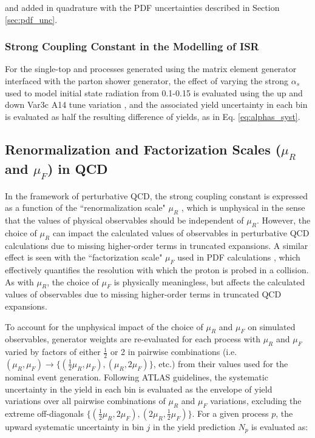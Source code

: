 \noindent and added in quadrature with the PDF uncertainties described in Section \ref{sec:pdf_unc}.

\subsubsection{Strong Coupling Constant in the Modelling of ISR}

For the single-top and \ttbar processes generated using the \POWHEGBOX matrix element generator interfaced with the  parton shower generator, the effect of varying the strong \(\alpha_s\) used to model initial state radiation from 0.1-0.15 is evaluated using the up and down Var3c A14 tune variation \cite{ATL-PHYS-PUB-2014-021}, and the associated yield uncertainty in each bin is evaluated as half the resulting difference of yields, as in Eq. \ref{eq:alphas_syst}. 

\subsection{Renormalization and Factorization Scales (\(\mu_R\) and \(\mu_F\)) in QCD}

In the framework of perturbative QCD, the strong coupling constant is expressed as a function of the ``renormalization scale" \(\mu_R\) \cite{PDG_2018}, which is unphysical in the sense that the values of physical observables should be independent of \(\mu_R\). However, the choice of \(\mu_R\) can impact the calculated values of observables in perturbative QCD calculations due to missing higher-order terms in truncated expansions. A similar effect is seen with the ``factorization scale" \(\mu_F\) used in PDF calculations \cite{maltoni2007choosing}, which effectively quantifies the resolution with which the proton is probed in a collision. As with \(\mu_R\), the choice of \(\mu_F\) is physically meaningless, but affects the calculated values of observables due to missing higher-order terms in truncated QCD expansions.

To account for the unphysical impact of the choice of \(\mu_R\) and \(\mu_F\) on simulated observables, generator weights are re-evaluated for each process with \(\mu_R\) and \(\mu_F\) varied by factors of either \(\frac{1}{2}\) or 2 in pairwise combinations (i.e. \((\mu_R, \mu_F)\rightarrow \{(\frac{1}{2}\mu_R, \mu_F), (\mu_R, 2\mu_F)\}\), etc.) from their values used for the nominal event generation. Following ATLAS guidelines, the systematic uncertainty in the yield in each bin is evaluated as the envelope of yield variations over all pairwise combinations of \(\mu_R\) and \(\mu_F\) variations, excluding the extreme off-diagonals \(\{(\frac{1}{2}\mu_R, 2\mu_F), (2\mu_R, \frac{1}{2}\mu_F)\}\). For a given process \(p\), the upward systematic uncertainty in bin \(j\) in the yield prediction \(N_p\) is evaluated as:

